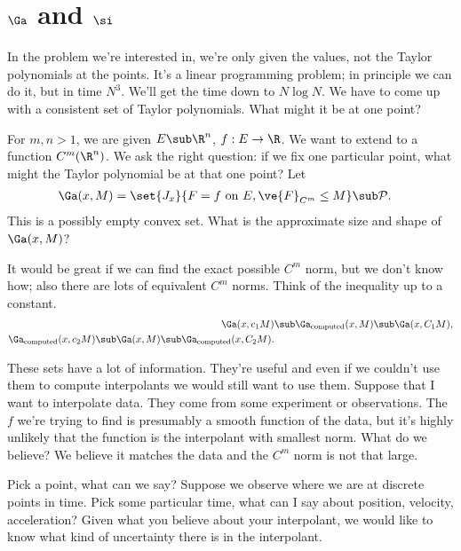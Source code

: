 
\section{$\Ga$ and $\si$}

In the problem we're interested in, we're only given the values, not the Taylor polynomials at the points. It's a linear programming problem; in principle we can do it, but in time $N^3$. We'll get the time down to $N\log N$. We have to come up with a consistent set of Taylor polynomials. What might it be at one point?

For $m,n>1$, we are given $E\sub \R^n$, $f:E\to \R$. We want to extend to a function $C^m(\R^n)$. 
We ask the right question: if we fix one particular point, what might the Taylor polynomial be at that one point?
Let 
\begin{align}
\Ga(x,M) &= \set{J_x}{F=f\text{ on }E, \ve{F}_{C^m}\le M}\sub \cal P.
\end{align}
This is a possibly empty convex set.
What is the approximate size and shape of $\Ga(x,M)$? 

It would be great if we can find the exact possible $C^m$ norm, but we don't know how; also there are lots of equivalent $C^m$ norms. Think of the inequality up to a constant. 
\begin{align}
\Ga(x,c_1M)&\sub
\Ga_{\text{computed}}(x,M) \sub \Ga (x,C_1M),\\
\Ga_{\text{computed}}(x,c_2M) \sub \Ga(x,M)\sub \Ga_{\text{computed}}(x,C_2M).
\end{align}

These sets have a lot of information. They're useful and even if we couldn't use them to compute interpolants we would still want to use them.
Suppose that I want to interpolate data. They come from some experiment or observations. The $f$ we're trying to find is presumably a smooth function of the data, but it's highly unlikely that the function is the interpolant with smallest norm. What do we believe? We believe it matches the data and the $C^m$ norm is not that large. 

Pick a point, what can we say? Suppose we observe where we are at discrete points in time. Pick some particular time, what can I say about position, velocity, acceleration? %
Given what you believe about your interpolant, we would like to know what kind of uncertainty there is in the interpolant. 

